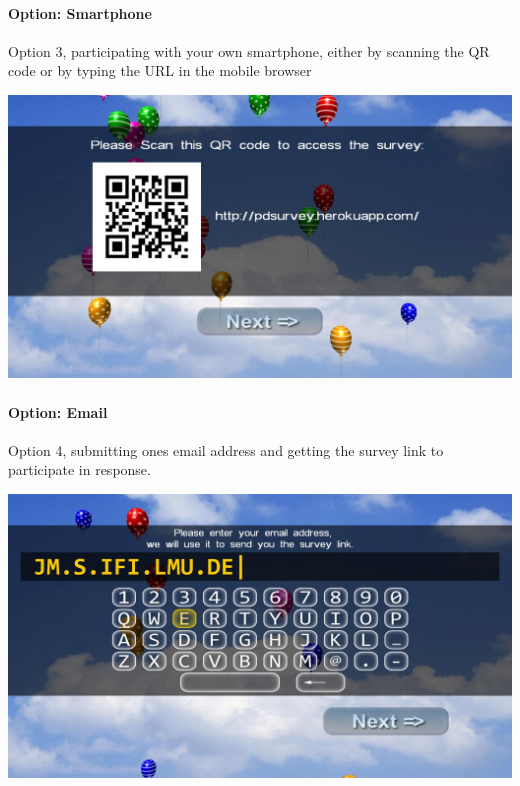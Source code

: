 \paragraph{Option: Smartphone}
\label{screenshot:smartphone-option}
Option 3, participating with your own smartphone, either by scanning the QR code or by typing the URL in the mobile browser

\begin{center}
    \includegraphics[width=\columnwidth]{img/screenshots/balloon-game/option-smartphone.jpg}
\end{center}




\clearpage
\paragraph{Option: Email}
\label{screenshot:email-option}
Option 4, submitting ones email address and getting the survey link to participate in response.

\begin{center}
    \includegraphics[width=\columnwidth]{img/screenshots/balloon-game/option-email.jpg}
\end{center}












